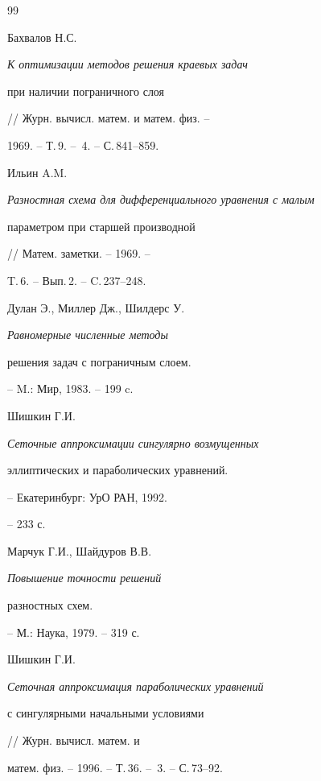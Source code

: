 \begin{thebibliography}{99}







Бахвалов Н.С. {\em К оптимизации методов решения краевых задач


при наличии пограничного слоя} // Журн. вычисл. матем. и матем. физ. --


1969. -- Т.\,9. -- \No\,4. -- С.\,841--859. 







Ильин A.M. {\em Разностная схема для дифференциального уравнения с малым 


параметром при старшей производной} // Матем. заметки. -- 1969. --


T.\,6. -- Вып.\,2. -- C.\,237--248. 







Дулан Э., Миллер Дж., Шилдерс У. {\em Равномерные численные методы 


решения задач с пограничным слоем.} -- M.: Мир, 1983. -- 199 c.







Шишкин Г.И. {\em Сеточные аппроксимации сингулярно возмущенных 


эллиптических и параболических уравнений.} -- Екатеринбург: УрО РАН, 1992. 


-- 233 с.







Марчук Г.И., Шайдуров В.В. {\em Повышение точности решений 


разностных схем.} -- М.: Наука, 1979. -- 319 с.







Шишкин Г.И. {\em Сеточная аппроксимация параболических уравнений 


с сингулярными начальными условиями} // Журн. вычисл. матем. и 


матем. физ. -- 1996. -- Т.\,36. -- \No\,3. -- С.\,73--92.






\end{thebibliography}
